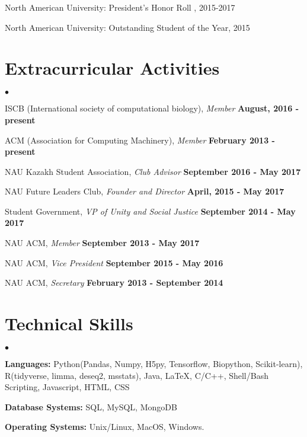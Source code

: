 \documentclass[margin,line]{res}
\newenvironment{list2}{
  \begin{list}{$\bullet$}{%
      \setlength{\itemsep}{0in}
      \setlength{\parsep}{0in} \setlength{\parskip}{0in}
      \setlength{\topsep}{0in} \setlength{\partopsep}{0in}
      \setlength{\leftmargin}{0.2in}}}{\end{list}}
\begin{document}
\begin{resume}
\vspace*{-2.5mm}
North American University: President's Honor Roll , 2015-2017

\vspace*{-2.5mm}
North American University: Outstanding Student of the Year, 2015


\section{\sc Extracurricular Activities}
\begin{list2}
\item ISCB (International society of computational biology), {\em Member} \hfill {\bf August, 2016 - present}
\item ACM (Association for Computing Machinery), {\em Member} \hfill  {\bf February 2013 - present}
\item NAU Kazakh Student Association, {\em Club Advisor} \hfill {\bf September 2016 - May 2017}
\item NAU Future Leaders Club, {\em Founder and Director} \hfill {\bf April, 2015 - May 2017}
\item Student Government, {\em VP of Unity and Social Justice} \hfill  {\bf September 2014 - May 2017}
\item NAU ACM, {\em Member} \hfill {\bf September 2013 - May 2017}
\item NAU ACM, {\em Vice President} \hfill  {\bf September 2015 - May 2016}
\item NAU ACM, {\em Secretary} \hfill  {\bf February 2013 - September 2014}
\end{list2}

\section{\sc Technical Skills}
\begin{list2}
\item {\bf Languages:}  Python(Pandas, Numpy, H5py, Tensorflow, Biopython, Scikit-learn), R(tidyverse, limma, deseq2, msstats), Java, \LaTeX, C/C++, Shell/Bash Scripting, Javascript, HTML, CSS
\item {\bf Database Systems:} SQL, MySQL, MongoDB
\item {\bf Operating Systems:}  Unix/Linux, MacOS, Windows.
\end{list2}


\end{resume}
\end{document}
